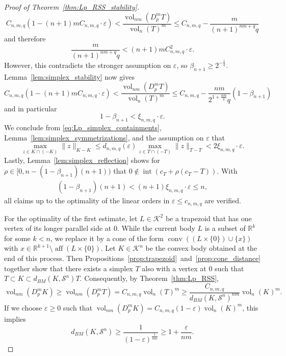 \documentclass{amsart}
\newcommand\R{\mathbb{R}}
\newcommand\CK{\mathcal{K}}
\DeclareMathOperator{\conv}{conv}
\DeclareMathOperator{\aff}{aff}
\DeclareMathOperator{\inte}{int}
\DeclareMathOperator{\vol}{vol}
\newcommand{\diff}[3]{D_{#1}^{#2} #3}
\newcommand{\simplex}[1]{\mathcal{S}^{#1}}
\begin{document}
\begin{proof}[Proof of Theorem~\ref{thm:Lp_RSS_stability}]
\[
    C_{n,m,q} (1 - (n+1) m C_{n,m,q} \cdot \varepsilon)
    < \frac{\vol_{nm}(\diff{p}{m}{T})}{\vol_n(T)^m}
    \leq C_{n,m,q} - \frac{m}{(n+1)^{nm+q} q}
\]
and therefore
\[
    \frac{m}{(n+1)^{nm+q}q}
    < (n+1) m C_{n,m,q}^2 \cdot \varepsilon.
\]
However, this contradicts the stronger assumption on $\varepsilon$,
so $\beta_{n+1} \geq 2^{-\frac{1}{q}}$.
Lemma~\ref{lem:simplex_stability} now gives
\[
    C_{n,m,q} (1 - (n+1) m C_{n,m,q} \cdot \varepsilon)
    < \frac{\vol_{nm}(\diff{p}{m}{T})}{\vol_n(T)^m}
    \leq C_{n,m,q} - \frac{nm}{2^{1+\frac{nm}{q}} q} (1-\beta_{n+1})
\]
and in particular
\[
    1-\beta_{n+1}
    < \xi_{n,m,q} \cdot \varepsilon.
\]
We conclude from \eqref{eq:Lp_simplex_containments}, Lemma~\ref{lem:simplex_symmetrizations}, and the assumption on $\varepsilon$ that
\[
    \max_{z \in K \cap (-K)} \|z\|_{K-K}
    \leq d_{n,m,q}(\varepsilon) \max_{z \in T \cap (-T)} \|z\|_{T-T}
    < 2 \xi_{n,m,q} \cdot \varepsilon.
\]
Lastly, Lemma~\ref{lem:simplex_reflection} shows for $\rho \in [0, n - (1 - \beta_{n+1})(n+1))$ that $0 \notin \inte(c_T + \rho (c_T - T))$.
With
\begin{align*}
	(1 - \beta_{n+1}) (n+1)
    < (n+1) \xi_{n,m,q} \cdot \varepsilon
    \leq n,
\end{align*}
all claims up to the optimality of the linear orders in $\varepsilon \leq c_{n,m,q}$ are verified.

For the optimality of the first estimate, let $L \in \CK^2$ be a trapezoid that has one vertex of its longer parallel side at $0$.
While the current body $L$ is a subset of $\R^k$ for some $k < n$, we replace it by a cone of 
the form $\conv( (L \times \{0\}) \cup \{x\})$ with $x \in \R^{k+1} \setminus \aff(L \times \{0\})$.
Let $K \in \CK^n$ be the convex body obtained at the end of this process.
Then Propositions~\ref{prop:trapezoid}~and~\ref{prop:cone_distance} together show that there exists a simplex $T$ also with a vertex at $0$ such that $T \subset K \subset d_{BM}(K,\simplex{n}) T$.
Consequently, by Theorem~\ref{thm:Lp_RSS},
\[
    \vol_{nm}(\diff{p}{m}{K})
    \geq \vol_{nm}(\diff{p}{m}{T})
    = C_{n,m,q} \vol_n(T)^m
    \geq \frac{C_{n,m,q}}{d_{BM}(K,\simplex{n})^{nm}} \vol_n(K)^m.
\]
If we choose $\varepsilon \geq 0$ such that $\vol_{nm}(\diff{p}{m}{K}) = C_{n,m,q} (1-\varepsilon) \vol_n(K)^m$, this implies
\[
    d_{BM}(K,\simplex{n})
    \geq \frac{1}{(1-\varepsilon)^{\frac{1}{nm}}}
    \geq 1 + \frac{\varepsilon}{nm}.
\]


\end{proof}
\end{document}
